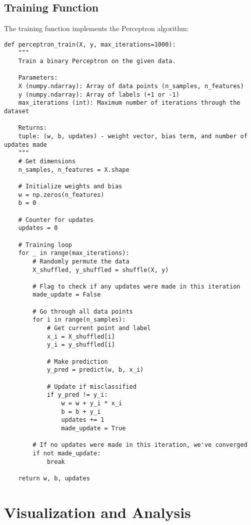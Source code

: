 \documentclass{article}
\begin{document}
\subsection{Training Function}

The training function implements the Perceptron algorithm:

\begin{lstlisting}[caption=Perceptron Training Function]
def perceptron_train(X, y, max_iterations=1000):
    """
    Train a binary Perceptron on the given data.
    
    Parameters:
    X (numpy.ndarray): Array of data points (n_samples, n_features)
    y (numpy.ndarray): Array of labels (+1 or -1)
    max_iterations (int): Maximum number of iterations through the dataset
    
    Returns:
    tuple: (w, b, updates) - weight vector, bias term, and number of updates made
    """
    # Get dimensions
    n_samples, n_features = X.shape
    
    # Initialize weights and bias
    w = np.zeros(n_features)
    b = 0
    
    # Counter for updates
    updates = 0
    
    # Training loop
    for _ in range(max_iterations):
        # Randomly permute the data
        X_shuffled, y_shuffled = shuffle(X, y)
        
        # Flag to check if any updates were made in this iteration
        made_update = False
        
        # Go through all data points
        for i in range(n_samples):
            # Get current point and label
            x_i = X_shuffled[i]
            y_i = y_shuffled[i]
            
            # Make prediction
            y_pred = predict(w, b, x_i)
            
            # Update if misclassified
            if y_pred != y_i:
                w = w + y_i * x_i
                b = b + y_i
                updates += 1
                made_update = True
        
        # If no updates were made in this iteration, we've converged
        if not made_update:
            break
    
    return w, b, updates
\end{lstlisting}

\section{Visualization and Analysis}
\end{document}
